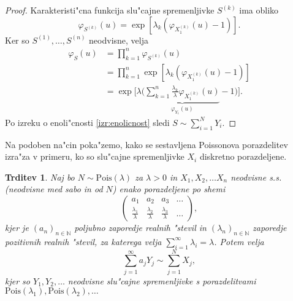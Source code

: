 \documentclass[12pt, a4paper, reqno]{amsart}
\theoremstyle{definition}
\theoremstyle{plain}
\newtheorem{trditev}[definicija]{Trditev}
\newcommand{\N}{\mathbb{N}}
\newcommand{\1}{\mathds{1}}
\newcommand{\Pois}[1]{\text{Pois}(#1)}
\newcommand*{\refPriloga}[1]{%
  \begingroup
    \hypersetup{
      linkcolor=red,
      linkbordercolor=red,
    }%
    \ref{#1}%
  \endgroup
}
\begin{document}
    \begin{proof}
        Karakteristi"cna funkcija slu"cajne spremenljivke $S^{(k)}$ ima obliko
        \begin{equation*}
            \varphi_{S^{(k)}}(u) = \exp\left[\lambda_k\left(\varphi_{X_1^{(k)}}(u) - 1\right)\right].
        \end{equation*}
        Ker so $S^{(1)}, \dots, S^{(n)}$ neodvisne, velja
        \begin{align*}
            \varphi_{S}(u) 
                &= \prod_{k=1}^n\varphi_{S^{(k)}}(u) \\
                &= \prod_{k=1}^n\exp\left[\lambda_k\left(\varphi_{X_1^{(k)}}(u) - 1\right)\right] \\
                &= \exp\Biggl[\lambda\Biggl(\underbrace{\sum_{k=1}^n \frac{\lambda_k}{\lambda} \varphi_{X_1^{(k)}}(u)}_{\varphi_{Y_1}(u)} - 1\Biggr)\Biggr].
        \end{align*}
        Po izreku o 
        enoli"cnosti \refPriloga{izr:enolicnost} sledi $S\sim\sum_{i=1}^{N}Y_i$.
    \end{proof}

    Na podoben na"cin poka"zemo, kako se sestavljena Poissonova porazdelitev izra"za v primeru, ko so
    slu"cajne spremenljivke $X_i$ diskretno porazdeljene.

    \begin{trditev}
        Naj bo $N\sim \Pois{\lambda}$  za $\lambda >0$ in $X_1, X_2, \dots X_n$ neodvisne s.s. (neodvisne 
        med sabo in od $N$) enako porazdeljene po shemi
        $$ 
        \begin{pmatrix}
            a_1 & a_2 & a_3 &  \dots  \\
            \tfrac{\lambda_1}{\lambda} & \tfrac{\lambda_2}{\lambda} & \tfrac{\lambda_3}{\lambda} & \dots 
        \end{pmatrix},
        $$
        kjer je $(a_n)_{n\in\N}$ poljubno zaporedje realnih "stevil in 
        $(\lambda_n)_{n\in\N}$ zaporedje pozitivnih realnih "stevil, za katerega velja 
        ${\sum_{i=1}^\infty\lambda_i = \lambda}$.
        Potem velja 
        \begin{equation*}
            \sum_{j=1}^\infty a_jY_j \sim \sum_{j=1}^NX_j,
        \end{equation*}
        kjer so $Y_1,Y_2,  \dots$ neodvisne slu"cajne spremenljivke s porazdelitvami \\
        $\Pois{\lambda_1},\Pois{\lambda_2}, \dots$
        \label{trd:NXjeEnakoaY}
    \end{trditev}
\end{document}
